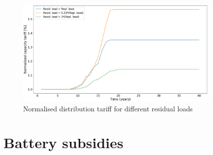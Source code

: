 \noindent
\newline
\begin{figure}[h!]
    \centering
    \includegraphics[width=10cm]{AppendixA/CapTarresid.PNG}
    \caption{Normalised distribution tariff for different residual loads}
    \label{fig:X}
\end{figure}
\section{Battery subsidies}
